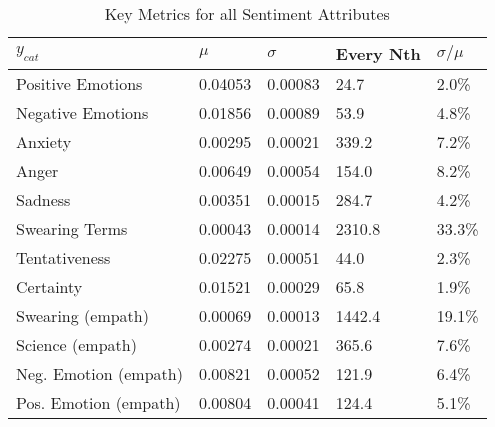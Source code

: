 \begin{table}[h]\centering
\caption{Key Metrics for all Sentiment Attributes}
	\label{fig: mean_std}
	\begin{tabular}{lllll}
	\toprule
	$y_{cat}$ &    $\mu$ & $\sigma$ & Every Nth & $\sigma / \mu$ \\
	\midrule
	Positive Emotions     &  0.04053 &  0.00083 &      24.7 &          2.0\% \\
	Negative Emotions     &  0.01856 &  0.00089 &      53.9 &          4.8\% \\
	Anxiety               &  0.00295 &  0.00021 &     339.2 &          7.2\% \\
	Anger                 &  0.00649 &  0.00054 &     154.0 &          8.2\% \\
	Sadness               &  0.00351 &  0.00015 &     284.7 &          4.2\% \\
	Swearing Terms        &  0.00043 &  0.00014 &    2310.8 &         33.3\% \\
	Tentativeness         &  0.02275 &  0.00051 &      44.0 &          2.3\% \\
	Certainty             &  0.01521 &  0.00029 &      65.8 &          1.9\% \\
	Swearing (empath)     &  0.00069 &  0.00013 &    1442.4 &         19.1\% \\
	Science (empath)      &  0.00274 &  0.00021 &     365.6 &          7.6\% \\
	Neg. Emotion (empath) &  0.00821 &  0.00052 &     121.9 &          6.4\% \\
	Pos. Emotion (empath) &  0.00804 &  0.00041 &     124.4 &          5.1\% \\
	\bottomrule
	\end{tabular}
	
\end{table}

